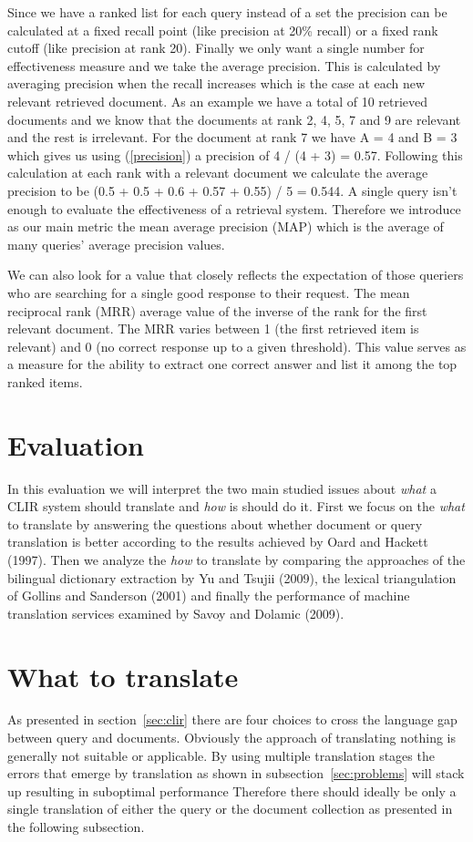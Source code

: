 \documentclass[journal]{IEEEtran}
\begin{document}
Since we have a ranked list for each query instead of a set the precision can be calculated at a fixed recall point (like precision at 20\% recall) or a fixed rank cutoff (like precision at rank 20).
Finally we only want a single number for effectiveness measure and we take the average precision.
This is calculated by averaging precision when the recall increases which is the case at each new relevant retrieved document.
As an example we have a total of 10 retrieved documents and we know that the documents at rank 2, 4, 5, 7 and 9 are relevant and the rest is irrelevant.
For the document at rank 7 we have A = 4 and B = 3 which gives us using (\ref{precision}) a precision of 4 / (4 + 3) = 0.57.
Following this calculation at each rank with a relevant document we calculate the average precision to be (0.5 + 0.5 + 0.6 + 0.57 + 0.55) / 5 = 0.544.
A single query isn't enough to evaluate the effectiveness of a retrieval system.
Therefore we introduce as our main metric the mean average precision (MAP) which is the average of many queries' average precision values.

We can also look for a value that closely reflects the expectation of those queriers who are searching for a single good response to their request.
The mean reciprocal rank (MRR) average value of the inverse of the rank for the first relevant document.
The MRR varies between 1 (the first retrieved item is relevant) and 0 (no correct response up to a given threshold).
This value serves as a measure for the ability to extract one correct answer and list it among the top ranked items.



\section{Evaluation}
In this evaluation we will interpret the two main studied issues about \textit{what} a CLIR system should translate and \textit{how} is should do it.
First we focus on the \textit{what} to translate by answering the questions about whether document or query translation is better according to the results achieved by Oard and Hackett (1997).
Then we analyze the \textit{how} to translate by comparing the approaches of the bilingual dictionary extraction by Yu and Tsujii (2009), the lexical triangulation of Gollins and Sanderson (2001) and finally the performance of machine translation services examined by Savoy and Dolamic (2009).


\section*{What to translate}
As presented in section~\ref{sec:clir} there are four choices to cross the language gap between query and documents.
Obviously the approach of translating nothing is generally not suitable or applicable.
By using multiple translation stages the errors that emerge by translation as shown in subsection~\ref{sec:problems} will stack up resulting in suboptimal performance
Therefore there should ideally be only a single translation of either the query or the document collection as presented in the following subsection.
\end{document}
